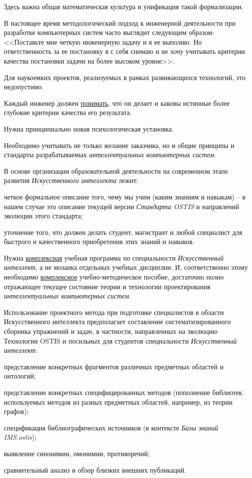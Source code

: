 {	Здесь важна общая математическая культура и унификация такой формализации.
	
	В настоящее время методологический подход к инженерной деятельности при разработке компьютерных систем часто выглядит следующим образом: <<Поставьте мне четкую инженерную задачу и я ее выполню. Но ответственность за ее постановку я с себя снимаю и не хочу учитывать критерии качества постановки задачи на более высоком уровне>>.
	
	Для наукоемких проектов, реализуемых в рамках развивающихся технологий, это недопустимо.
	
	Каждый инженер должен \uline{понимать}, что он делает и каковы истинные более глубокие критерии качества его результата.
	
	Нужна принципиально новая психологическая установка.
	
	Необходимо учитывать не только желание заказчика, но и общие принципы и стандарты разрабатываемых \textit{интеллектуальных компьютерных систем}.
	
	В основе организации образовательной деятельности на современном этапе развития \textit{Искусственного интеллекта} лежит:
	\begin{scnitemize}
		\item четкое формальное описание того, чему мы учим (каким знаниям и навыкам) -- в нашем случае это описание текущей версии \textit{Стандарта OSTIS} и направлений эволюции этого стандарта;
		\item уточнение того, что должен делать студент, магистрант и любой специалист для быстрого и качественного приобретения этих знаний и навыков.
	\end{scnitemize}
	
	Нужна \uline{комплексная} учебная программа по специальности \textit{Искусственный интеллект}, а не мозаика отдельных учебных дисциплин. И, соответственно этому необходимо \uline{комплексное} учебно-методическое пособие, достаточно полно отражающее текущее состояние теории и технологии проектирования \textit{интеллектуальных компьютерных систем}.
	
	Использование проектного метода при подготовке специалистов в области Искусственного интеллекта предполагает составление систематизированного сборника упражнений и задач, в частности, направленных на эволюцию Технологии OSTIS и посильных для студентов специальности \textit{Искусственный интеллект}:
	\begin{scnitemize}
		\item представление конкретных фрагментов различных предметных областей и онтологий;	
		\item представление конкретных специфицированных методов (пополнение библиотек используемых методов из разных предметных областей, например, из теории графов);
		\item спецификация библиографических источников (в контексте \textit{Базы знаний IMS.ostis});
		\item выявление синонимии, омонимии, противоречий;
		\item сравнительный анализ и обзор близких внешних публикаций.
	\end{scnitemize}
	
}
